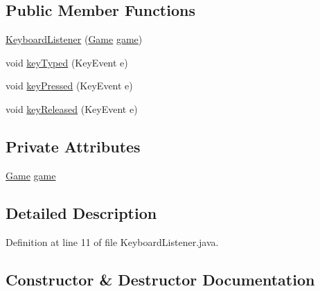 \subsection*{Public Member Functions}
\begin{DoxyCompactItemize}
\item 
\hyperlink{classinputs_1_1_keyboard_listener_af14b9b202dcb40aadbfcdf0d4b658349}{Keyboard\+Listener} (\hyperlink{classprogetto_1_1_game}{Game} \hyperlink{classinputs_1_1_keyboard_listener_ac6a5ed6191fcf3a5bf0445921feb4f48}{game})
\item 
void \hyperlink{classinputs_1_1_keyboard_listener_ae9358abc251c2552e1f2c743d881df8d}{key\+Typed} (Key\+Event e)
\item 
void \hyperlink{classinputs_1_1_keyboard_listener_aa12eb1084be2c4d9b03d5f248f00900d}{key\+Pressed} (Key\+Event e)
\item 
void \hyperlink{classinputs_1_1_keyboard_listener_af9e79ab3bcfe3fa9df90b04135486f5b}{key\+Released} (Key\+Event e)
\end{DoxyCompactItemize}
\subsection*{Private Attributes}
\begin{DoxyCompactItemize}
\item 
\hyperlink{classprogetto_1_1_game}{Game} \hyperlink{classinputs_1_1_keyboard_listener_ac6a5ed6191fcf3a5bf0445921feb4f48}{game}
\end{DoxyCompactItemize}


\subsection{Detailed Description}


Definition at line 11 of file Keyboard\+Listener.\+java.



\subsection{Constructor \& Destructor Documentation}
\mbox{\label{classinputs_1_1_keyboard_listener_af14b9b202dcb40aadbfcdf0d4b658349}} 
